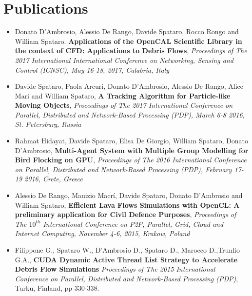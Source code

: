 \documentclass[a4paper,10pt]{article}
\begin{document}
\begin{center}
\mbox{}
\end{center}

\section{Publications}



\begin{itemize}

\item Donato D'Ambrosio, Alessio De Rango, Davide Spataro, Rocco Rongo and William Spataro. \textbf{Applications of the OpenCAL Scientific Library in the context of CFD: Applications to Debris Flows}, \emph{Proceedings of The 2017 International
  International Conference on Networking, Sensing and Control (ICNSC),
  May 16-18, 2017, Calabria, Italy} 

  \item Davide Spataro, Paola Arcuri, Donato D'Ambrosio, Alessio De Rango, Alice Mari and William Spataro, \textbf{A Tracking Algorithm for Particle-like Moving Objects}, \emph{Proceedings of The 2017 International
  Conference on Parallel, Distributed and Network-Based Processing (PDP),
  March 6-8 2016, St. Petersburg, Russia
  }
  \item Rahmat Hidayat, Davide Spataro, Elisa De Giorgio, William Spataro,
  Donato D'Ambrosio, \textbf{Multi-Agent System with Multiple Group Modelling
  for Bird Flocking on GPU}, \emph{Proceedings of The 2016 International
  Conference on Parallel, Distributed and Network-Based Processing (PDP),
  February 17-19 2016, Crete, Greece}

\item Alessio De Rango, Mauizio Macr\'i, Davide Spataro, Donato D'Ambrosio and
  William Spataro, \textbf{Efficient Lava Flows Simulations with OpenCL: A
  preliminary application for Civil Defence Purposes}, \emph{Proceedings of
  The $10^{th}$ International Conference on P2P, Parallel, Grid, Cloud and
  Internet Computing, November 4-6, 2015, Krakow, Poland}
  
	\item Filippone G., Spataro W., D'Ambrosio D., Spataro D., 
	Marocco D.,Trunfio G.A., \textbf{CUDA Dynamic Active Thread List Strategy 
	to Accelerate Debris Flow Simulations} \emph{Proceedings of The 2015 International Conference on Parallel, 
	Distributed and Network-Based Processing (PDP)}, Turku, Finland, pp 330-338.
	

\end{itemize}
\end{document}
